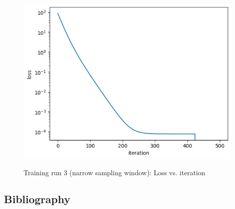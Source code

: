 \documentclass[]{article}
\begin{document}
\begin{appendices}
\begin{figure}[H]
	\caption{Training run 3 (narrow sampling window): Loss vs. iteration}
	\centering
	\includegraphics[scale=0.60]{poly-loss-training-3.png}
	\label{fig:poly-loss-training-3}
\end{figure}




\end{appendices}



\newpage
\begin{appendices}
	\section{Bibliography}
	\printbibliography
\end{appendices}
\end{document}
